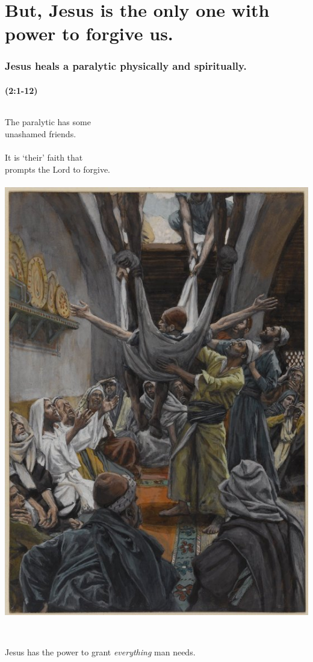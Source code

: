 \section{But, Jesus is the only one with power to forgive us.}
\begin{frame}
\frametitle{Jesus heals a paralytic physically and spiritually.}
\framesubtitle{(2:1-12)}
\begin{columns}
\column{5.5cm}
The paralytic has some\\unashamed friends.\\~\\
It is `their' faith that\\prompts the Lord to forgive.\\~\\
\column{4.5cm}
\includegraphics[width=\textwidth]{graphics/paralytic.jpg}
\end{columns}
\centering~\\
Jesus has the power to grant \emph{everything} man needs.
\end{frame}

